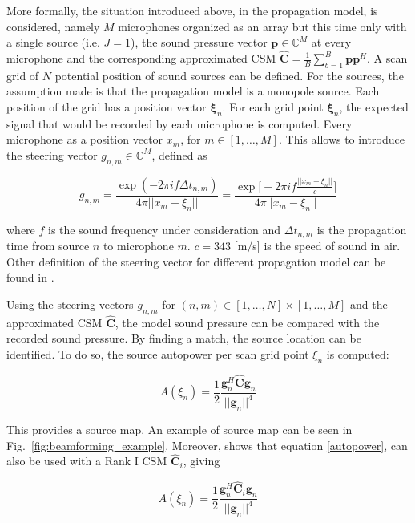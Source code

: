 \documentclass[11pt,a4paper,twoside]{report}
\begin{document}
More formally, the situation introduced above, in the propagation model, is considered, namely $M$ microphones organized as an array but this time only with a single source (i.e. $J = 1$), the sound pressure vector $\mathbf{p} \in \mathbb{C}^M$ at every microphone and the corresponding approximated CSM $\hat{\mathbf{C}} = \frac{1}{B} \sum_{b = 1}^{B} \mathbf{p}\mathbf{p}^H$. A scan grid of $N$ potential position of sound sources can be defined. For the sources, the assumption made is that the propagation model is a monopole source. Each position of the grid has a position vector $\mathbf{\xi}_n$. For each grid point $\mathbf{\xi}_n$, the expected signal that would be recorded by each microphone is computed. Every microphone as a position vector $x_m$, for $m \in [1, \dots, M]$. This allows to introduce the  steering vector $g_{n,m} \in \mathbb{C}^M$, defined as 

\begin{equation}
    g_{n,m} = \frac{\exp(-2 \pi i f \Delta t_{n,m})}{4\pi ||x_m -\xi_n||}
    = \frac{\exp \biggl[ -2 \pi i f \frac{||x_m -\xi_n||}{c} \biggr] }{4\pi ||x_m -\xi_n||}  
\end{equation}


where $f$ is the sound frequency under consideration and $\Delta t_{n,m}$ is the propagation time from source $n$ to microphone $m$. $c = 343$ [m/s] is the speed of sound in air. Other definition of the steering vector for different propagation model can be found in \cite{sarradj2012three}.

Using the steering vectors $g_{n,m}$ for $(n,m) \in [1, \dots, N] \times [1, \dots, M]$ and the approximated CSM $\hat{\mathbf{C}}$, the model sound pressure can be compared with the recorded sound pressure. By finding a match, the source location can be identified. To do so, the source autopower per scan grid point $\xi_n$ is computed:

\begin{equation}
    \label{autopower}
    A(\xi_n) = \frac{1}{2} \frac{\mathbf{g}_{n}^H \hat{\mathbf{C}} \mathbf{g}_{n}}{||\mathbf{g}_{n}||^4}
\end{equation}

This provides a source map. An example of source map can be seen in Fig.~\ref{fig:beamforming_example}. Moreover, \cite{sarradj2010fast} shows that equation \ref{autopower}, can also be used with a Rank I CSM $\hat{\mathbf{C}}_i$, giving

\begin{equation}
    A(\xi_n) = \frac{1}{2} \frac{\mathbf{g}_{n}^H \hat{\mathbf{C}}_i \mathbf{g}_{n}}{||\mathbf{g}_{n}||^4}
\end{equation}
\end{document}
